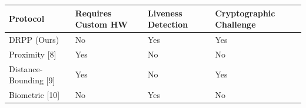\begin{tabular}{llll}
\toprule
Protocol & Requires Custom HW & Liveness Detection & Cryptographic Challenge \\
\midrule
DRPP (Ours) & No & Yes & Yes \\
Proximity [8] & Yes & No & No \\
Distance-Bounding [9] & Yes & No & Yes \\
Biometric [10] & No & Yes & No \\
\bottomrule
\end{tabular}
